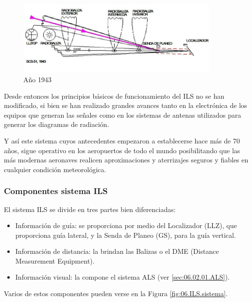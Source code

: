 \begin{figure}[!h]
  \centering
  \includegraphics[width = 0.9\textwidth]{06.radionavegacion/Imagenes/06.Sistemas.Aproximacion/06_1943.png}
    \caption{ Año 1943}
  \label{fig:06.ILS.1943}
\end{figure}

Desde entonces los principios básicos de funcionamiento del ILS no se han modificado, si bien se
han realizado grandes avances tanto en la electrónica de los equipos que generan las señales como en
los sistemas de antenas utilizados para generar los diagramas de radiación.

Y así este sistema cuyos antecedentes empezaron a establecerse hace más de 70 años, sigue
operativo en los aeropuertos de todo el mundo posibilitando que las más modernas aeronaves realicen
aproximaciones y aterrizajes seguros y fiables en cualquier condición meteorológica.

\subsubsection{Componentes sistema ILS}
\label{sec:06.ILS.componentes}

El sistema ILS se divide en tres partes bien diferenciadas:
\begin{itemize}
\item Información de guía: se proporciona por medio del Localizador
  (LLZ), que proporciona guía lateral, y la Senda de Planeo (GS), para
  la guía vertical.
\item Información de distancia: la brindan las Balizas o el DME (Distance Measurement Equipment).
\item Información visual: la compone el sistema ALS (ver \ref{sec:06.02.01.ALS}).
\end{itemize}

Varios de estos componentes pueden verse en la Figura \ref{fig:06.ILS.sistema}.


